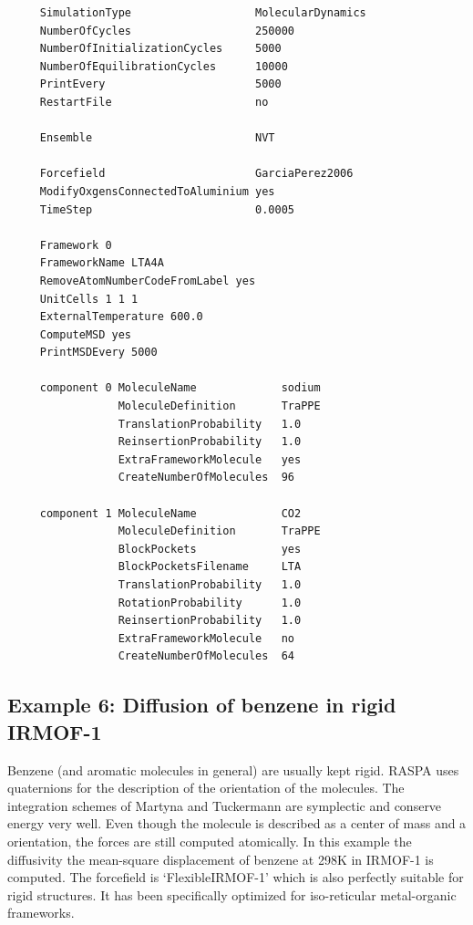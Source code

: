 \begin{tiny}
\begin{verbatim}
     SimulationType                   MolecularDynamics
     NumberOfCycles                   250000
     NumberOfInitializationCycles     5000
     NumberOfEquilibrationCycles      10000
     PrintEvery                       5000
     RestartFile                      no
     
     Ensemble                         NVT
     
     Forcefield                       GarciaPerez2006
     ModifyOxgensConnectedToAluminium yes
     TimeStep                         0.0005
     
     Framework 0
     FrameworkName LTA4A
     RemoveAtomNumberCodeFromLabel yes
     UnitCells 1 1 1
     ExternalTemperature 600.0
     ComputeMSD yes
     PrintMSDEvery 5000
     
     component 0 MoleculeName             sodium
                 MoleculeDefinition       TraPPE
                 TranslationProbability   1.0
                 ReinsertionProbability   1.0
                 ExtraFrameworkMolecule   yes
                 CreateNumberOfMolecules  96
     
     component 1 MoleculeName             CO2
                 MoleculeDefinition       TraPPE
                 BlockPockets             yes
                 BlockPocketsFilename     LTA
                 TranslationProbability   1.0
                 RotationProbability      1.0
                 ReinsertionProbability   1.0
                 ExtraFrameworkMolecule   no
                 CreateNumberOfMolecules  64
\end{verbatim}
\end{tiny}

\subsection*{Example 6: Diffusion of benzene in rigid IRMOF-1}

Benzene (and aromatic molecules in general) are usually kept rigid. RASPA uses quaternions for the description of the
orientation of the molecules. The integration schemes of Martyna and Tuckermann are symplectic and conserve energy
very well. Even though the molecule is described as a center of mass and a orientation, the forces are still computed
atomically. In this example the diffusivity the mean-square displacement of benzene at 298K in IRMOF-1 is computed.
The forcefield is `FlexibleIRMOF-1' which is also perfectly suitable for rigid structures. It has been specifically
optimized for iso-reticular metal-organic frameworks.

